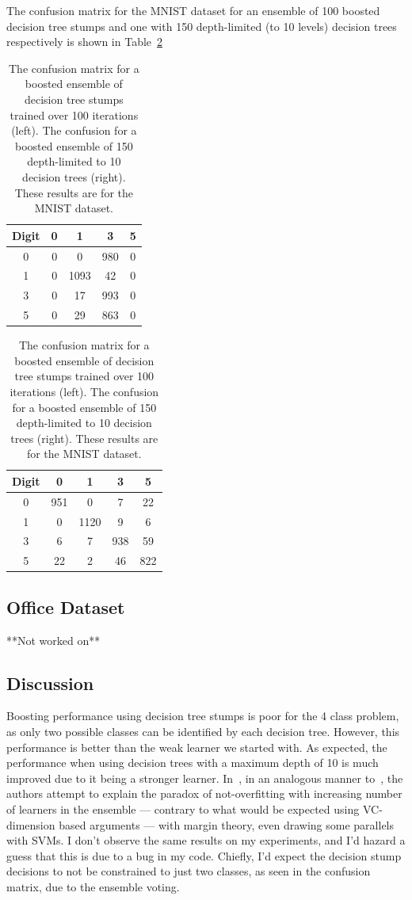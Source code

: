 \documentclass[5pt]{article}
\begin{document}
The confusion matrix for the MNIST dataset for an ensemble of 100 boosted
decision tree stumps and one with 150 depth-limited (to 10 levels)
decision trees respectively is shown in Table~\ref{tab:confusionMNISTBoost}
\begin{table}
\centering
\begin{tabular}{ccccc}
\toprule
Digit & 0 & 1 & 3 & 5 \\
\midrule
0 & 0 & 0 & 980 & 0 \\
1 & 0 & 1093 & 42 & 0 \\
3 & 0 & 17 & 993 & 0 \\
5 & 0 & 29 & 863 & 0 \\
\bottomrule
\end{tabular}
\quad
\begin{tabular}{ccccc}
\toprule
Digit & 0 & 1 & 3 & 5\\
\midrule
0 & 951 & 0 & 7 & 22 \\
1 & 0 & 1120 & 9 & 6 \\
3 & 6 & 7 & 938 & 59 \\
5 & 22 & 2 & 46 & 822 \\
\bottomrule
\end{tabular}
\caption{The confusion matrix for a boosted ensemble of decision tree stumps
  trained over 100 iterations (left). The confusion for a boosted ensemble of
  150 depth-limited to 10 decision trees (right). These results are for the MNIST
dataset.}
\label{tab:confusionMNISTBoost}
\end{table}

\subsection{Office Dataset}
**Not worked on**

\subsection{Discussion}
Boosting performance using decision tree stumps is poor for the 4 class
problem, as only two possible classes can be identified by each decision tree.
However, this performance is better than the weak learner we started with. As
expected, the performance when using decision trees with a maximum depth of 10
is much improved due to it being a stronger learner. In~\cite{freund1999short},
in an analogous manner to~\cite{breiman2001random}, the authors attempt to
explain the paradox of not-overfitting with increasing number of learners in
the ensemble --- contrary to what would be expected using VC-dimension based
arguments --- with margin theory, even drawing some parallels with SVMs. I don't
observe the same results on my experiments, and I'd hazard a guess that this is
due to a bug in my code. Chiefly, I'd expect the decision stump decisions to
not be constrained to just two classes, as seen in the confusion matrix,  due
to the ensemble voting.

\medskip


\end{document}

